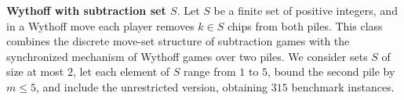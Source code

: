 \documentclass[review]{elsarticle}
\newcommand{\set}[1]{\{ #1 \}}
\newcommand{\tuple}[1]{\langle {#1} \rangle}
\newcommand{\true}{\top}
\newcommand{\statevar}{\mathcal{X}}
\newcommand{\act}{\mathcal{A}}
\newcommand{\constraint}{\mathcal{C}}
\newcommand{\estate}{\mathcal{E}}
\newcommand{\pre}{\mathtt{pre}}
\newcommand{\eff}{\mathtt{eff}}
\begin{document}
{\color{red}\textbf{Wythoff with subtraction set $S$}. Let $S$ be a finite set of positive integers, and in a Wythoff move each player removes $k \in S$ chips from both piles.}
{\color{red}This class combines the discrete move-set structure of subtraction games with the synchronized mechanism of Wythoff games over two piles.}
{\color{red}We consider sets $S$ of size at most $2$, let each element of $S$ range from $1$ to $5$, bound the second pile by $m \le 5$, and include the unrestricted version, obtaining $315$ benchmark instances.}
\end{document}
